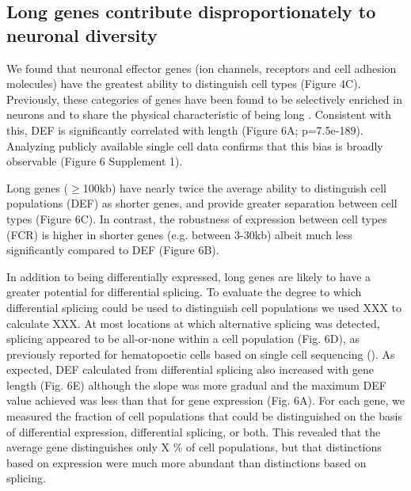 \subsection{Long genes contribute disproportionately to neuronal diversity}

We found that neuronal effector genes (ion channels, receptors and cell adhesion molecules) have the greatest ability to distinguish cell types (Figure 4C). Previously, these categories of genes have been found to be selectively enriched in neurons and to share the physical characteristic of being long \citep{Sugino_2014,Gabel_2015,Zylka_2015}. Consistent with this, DEF is significantly correlated with length (Figure 6A; p=7.5e-189). Analyzing publicly available single cell data confirms that this bias is broadly observable (Figure 6 Supplement 1). 

Long genes ($\geq$100kb) have nearly twice the average ability to distinguish cell populations (DEF) as shorter genes, and provide greater separation between cell types (Figure 6C). In contrast, the robustness of expression between cell types (FCR) is higher in shorter genes (e.g. between 3-30kb) albeit much less significantly compared to DEF (Figure 6B). 

In addition to being differentially expressed, long genes are likely to have a greater potential for differential splicing. To evaluate the degree to which differential splicing could be used to distinguish cell populations we used XXX to calculate XXX. At most locations at which alternative splicing was detected, splicing appeared to be all-or-none within a cell population (Fig. 6D), as previously reported for hematopoetic cells based on single cell sequencing (). As expected, DEF calculated from differential splicing also increased with gene length (Fig. 6E) although the slope was more gradual and the maximum DEF value achieved was less than that for gene expression (Fig. 6A). For each gene, we measured the fraction of cell populations that could be distinguished on the basis of differential expression, differential splicing, or both. This revealed that the average gene distinguishes only X \% of cell populations, but that distinctions based on expression were much more abundant than distinctions based on splicing.  

